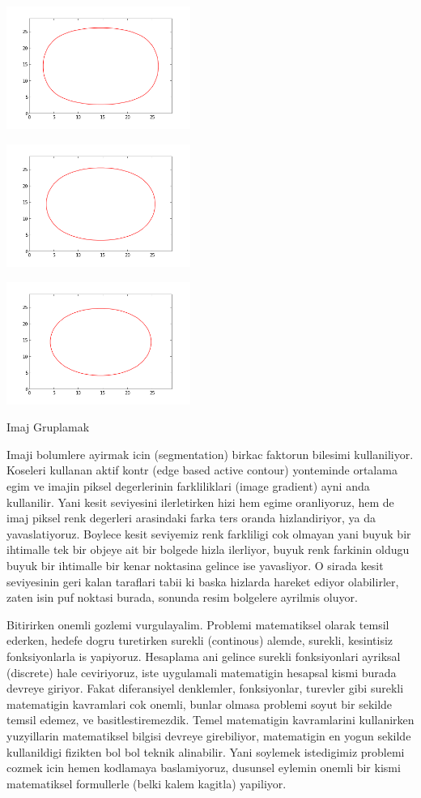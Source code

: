 \documentclass[12pt,fleqn]{article}\usepackage{../common}
\begin{document}
\includegraphics[height=4cm]{level_1_20.png}

\includegraphics[height=4cm]{level_1_30.png}

\includegraphics[height=4cm]{level_1_40.png}

Imaj Gruplamak

Imaji bolumlere ayirmak icin (segmentation) birkac faktorun bilesimi
kullaniliyor. Koseleri kullanan aktif kontr (edge based active contour)
yonteminde ortalama egim ve imajin piksel degerlerinin farkliliklari (image
gradient) ayni anda kullanilir. Yani kesit seviyesini ilerletirken hizi hem
egime oranliyoruz, hem de imaj piksel renk degerleri arasindaki farka ters
oranda hizlandiriyor, ya da yavaslatiyoruz. Boylece kesit seviyemiz renk
farkliligi cok olmayan yani buyuk bir ihtimalle tek bir objeye ait bir
bolgede hizla ilerliyor, buyuk renk farkinin oldugu buyuk bir ihtimalle bir
kenar noktasina gelince ise yavasliyor. O sirada kesit seviyesinin geri
kalan taraflari tabii ki baska hizlarda hareket ediyor olabilirler, zaten
isin puf noktasi burada, sonunda resim bolgelere ayrilmis oluyor. 

Bitirirken onemli gozlemi vurgulayalim. Problemi matematiksel olarak temsil
ederken, hedefe dogru turetirken surekli (continous) alemde, surekli,
kesintisiz fonksiyonlarla is yapiyoruz. Hesaplama ani gelince surekli
fonksiyonlari ayriksal (discrete) hale ceviriyoruz, iste uygulamali
matematigin hesapsal kismi burada devreye giriyor. Fakat diferansiyel
denklemler, fonksiyonlar, turevler gibi surekli matematigin kavramlari cok
onemli, bunlar olmasa problemi soyut bir sekilde temsil edemez, ve
basitlestiremezdik. Temel matematigin kavramlarini kullanirken yuzyillarin
matematiksel bilgisi devreye girebiliyor, matematigin en yogun sekilde
kullanildigi fizikten bol bol teknik alinabilir. Yani soylemek istedigimiz
problemi cozmek icin hemen kodlamaya baslamiyoruz, dusunsel eylemin onemli
bir kismi matematiksel formullerle (belki kalem kagitla) yapiliyor.
\end{document}
